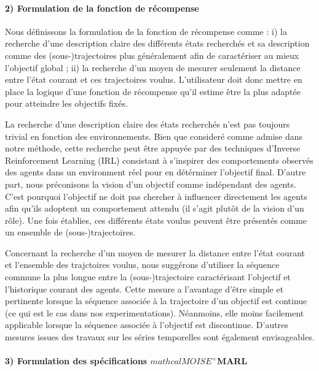\documentclass[sigconf,anonymous]{aamas}
\begin{document}
\paragraph{\textbf{2) Formulation de la fonction de récompense}} \quad

\noindent Nous définissons la formulation de la fonction de récompense comme : \quad i) la recherche d'une description claire des différents états recherchés et sa description comme des (sous-)trajectoires plus généralement afin de caractériser au mieux l'objectif global ; \quad ii) la recherche d'un moyen de mesurer seulement la distance entre l'état courant et ces trajectoires voulus. L'utilisateur doit donc mettre en place la logique d'une fonction de récompense qu'il estime être la plus adaptée pour atteindre les objectifs fixés.

La recherche d'une description claire des états recherchés n'est pas toujours trivial en fonction des environnements. Bien que consideré comme admise dans notre méthode, cette recherche peut être appuyée par des techniques d'Inverse Reinforcement Learning (IRL) consistant à s'inspirer des comportements observés des agents dans un environment réel pour en détérminer l'objectif final. D'autre part, nous préconisons la vision d'un objectif comme indépendant des agents. C'est pourquoi l'objectif ne doit pas chercher à influencer directement les agents afin qu'ils adoptent un comportement attendu (il s'agit plutôt de la vision d'un rôle). Une fois établies, ces différents états voulus peuvent être présentés comme un ensemble de (sous-)trajectoires.

Concernant la recherche d'un moyen de mesurer la distance entre l'état courant et l'ensemble des trajctoires voulus, nous suggérons d'utiliser la séquence commune la plus longue entre la (sous-)trajectoire caractérisant l'objectif et l'historique courant des agents. Cette mesure a l'avantage d'être simple et pertinente lorsque la séquence associée à la trajectoire d'un objectif est continue (ce qui est le cas dans nos experimentations). Néanmoins, elle moins facilement applicable lorsque la séquence associée à l'objectif est discontinue. D'autres mesures issues des travaux sur les séries temporelles sont également envisageables.

\paragraph{\textbf{3) Formulation des spécifications $mathcal{M}OISE^+$MARL}} \quad
\end{document}
